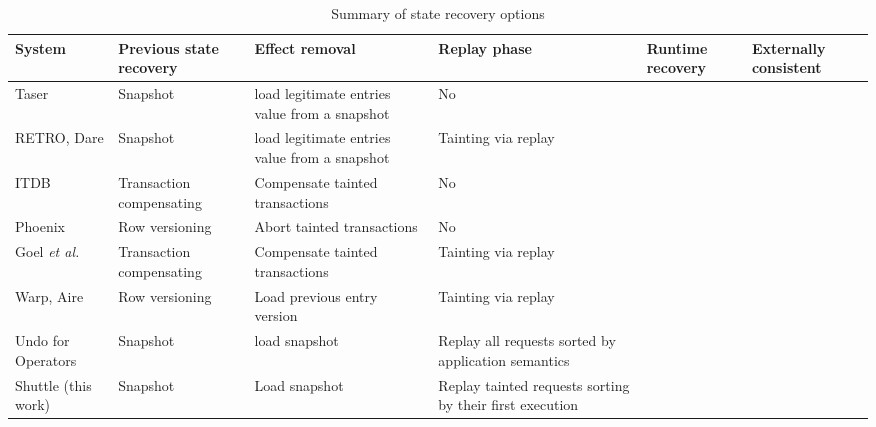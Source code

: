 \begin{center}
\begin{table}[ht]
\begin{tabular}{|m{2.5cm}|m{2.3cm}|m{2.7cm}|m{2.5cm}|C{1.5cm}|C{1.8cm}|}
\hline
\textbf{System} & \textbf{Previous state recovery}		& \textbf{Effect removal} & \textbf{Replay phase} & \textbf{Runtime recovery} & \textbf{Externally consistent} \\ \hline
\cite{taser}Taser			  		& Snapshot 	& load legitimate entries value from a snapshot & No &  &  \\ \hline
\cite{retro} \cite{dare} RETRO, Dare	& Snapshot 	& load legitimate entries value from a snapshot & Tainting \newline via replay & &  \\ \hline
\cite{itdb} ITDB						& Transaction compensating & Compensate tainted \newline transactions & No & \cmark & \\ \hline
\cite{phoenix} Phoenix					& Row \newline versioning & Abort tainted transactions & No & 	&		\\ \hline
\cite{goel} Goel \textit{et al.}	& Transaction compensating & Compensate tainted \newline transactions & Tainting \newline via replay & & \\ \hline
\cite{warp} \cite{aire} Warp, Aire		& Row \newline versioning & Load previous entry version & Tainting \newline via replay & \cmark & \cmark	\\ \hline
\cite{undoForOperators} Undo for \newline Operators	& Snapshot & load snapshot & Replay all \newline requests sorted by application semantics & & \cmark		\\ \hline
Shuttle	\newline  (this work)								& Snapshot & Load snapshot & Replay tainted requests sorting by their first \newline execution & \cmark  & \cmark \\ \hline

\end{tabular}
\caption{Summary of state recovery options}
\label{tab:recovery}
\end{table}
\end{center} 


